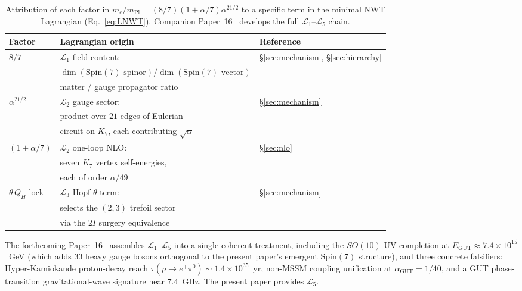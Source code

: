 \documentclass[11pt]{article}
\begin{document}
\begin{table}[H]
\centering
\renewcommand{\arraystretch}{1.25}
\begin{tabular}{lll}
\toprule
\textbf{Factor} & \textbf{Lagrangian origin} & \textbf{Reference} \\
\midrule
$8/7$ &
  $\mathcal{L}_1$ field content: &
  \S\ref{sec:mechanism}, \S\ref{sec:hierarchy} \\
& $\dim(\mathrm{Spin}(7)\text{ spinor}) /
   \dim(\mathrm{Spin}(7)\text{ vector})$ & \\
& matter / gauge propagator ratio & \\
\midrule
$\alpha^{21/2}$ &
  $\mathcal{L}_2$ gauge sector: &
  \S\ref{sec:mechanism} \\
& product over $21$ edges of Eulerian & \\
& circuit on $K_7$, each contributing $\sqrt{\alpha}$ & \\
\midrule
$(1 + \alpha/7)$ &
  $\mathcal{L}_2$ one-loop NLO: &
  \S\ref{sec:nlo} \\
& seven $K_7$ vertex self-energies, & \\
& each of order $\alpha/49$ & \\
\midrule
$\theta\,Q_H$ lock &
  $\mathcal{L}_3$ Hopf $\theta$-term: &
  \S\ref{sec:mechanism} \\
& selects the $(2,3)$ trefoil sector & \\
& via the $2I$ surgery equivalence & \\
\bottomrule
\end{tabular}
\caption{Attribution of each factor in
$m_e/m_\text{Pl} = (8/7)(1 + \alpha/7)\alpha^{21/2}$ to a
specific term in the minimal NWT Lagrangian
(Eq.~\ref{eq:LNWT}).  Companion Paper~16~\cite{paper16}
develops the full $\mathcal{L}_1$--$\mathcal{L}_5$ chain.}
\label{tab:lagrangian-attribution}
\end{table}

The forthcoming Paper~16~\cite{paper16} assembles
$\mathcal{L}_1$--$\mathcal{L}_5$ into a single coherent
treatment, including the $SO(10)$ UV completion at
$E_\text{GUT} \approx 7.4 \times 10^{15}$~GeV (which adds
$33$ heavy gauge bosons orthogonal to the present paper's
emergent $\mathrm{Spin}(7)$ structure), and three concrete
falsifiers: Hyper-Kamiokande proton-decay reach
$\tau(p \to e^+ \pi^0) \sim 1.4 \times 10^{35}$~yr,
non-MSSM coupling unification at $\alpha_\text{GUT} = 1/40$,
and a GUT phase-transition gravitational-wave signature near
$7.4$~GHz.  The present paper provides $\mathcal{L}_5$.
\end{document}
